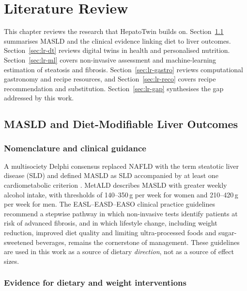 \chapter{Literature Review}
\label{chap:litreview}

This chapter reviews the research that HepatoTwin builds on. Section~\ref{sec:lr-masld} summarises MASLD and the clinical evidence linking diet to liver outcomes. Section~\ref{sec:lr-dt} reviews digital twins in health and personalised nutrition. Section~\ref{sec:lr-ml} covers non-invasive assessment and machine-learning estimation of steatosis and fibrosis. Section~\ref{sec:lr-gastro} reviews computational gastronomy and recipe resources, and Section~\ref{sec:lr-reco} covers recipe recommendation and substitution. Section~\ref{sec:lr-gap} synthesises the gap addressed by this work.

\section{MASLD and Diet-Modifiable Liver Outcomes}
\label{sec:lr-masld}

\subsection{Nomenclature and clinical guidance}

A multisociety Delphi consensus replaced NAFLD with the term steatotic liver disease (SLD) and defined MASLD as SLD accompanied by at least one cardiometabolic criterion \cite{rinella2023}. MetALD describes MASLD with greater weekly alcohol intake, with thresholds of 140--350\,g per week for women and 210--420\,g per week for men. The EASL--EASD--EASO clinical practice guidelines \cite{easl2024} recommend a stepwise pathway in which non-invasive tests identify patients at risk of advanced fibrosis, and in which lifestyle change, including weight reduction, improved diet quality and limiting ultra-processed foods and sugar-sweetened beverages, remains the cornerstone of management. These guidelines are used in this work as a source of dietary \emph{direction}, not as a source of effect sizes.

\subsection{Evidence for dietary and weight interventions}

